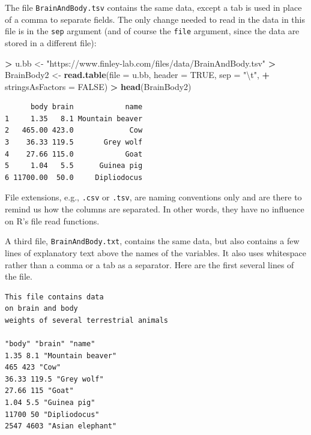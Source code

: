 \documentclass[
]{krantz}
\makeatletter
\newenvironment{Shaded}{\begin{snugshade}}{\end{snugshade}}
\newcommand{\CharTok}[1]{\textcolor[rgb]{0.5,0.5,0.5}{#1}}
\newcommand{\DataTypeTok}[1]{\textcolor[rgb]{0.27,0.27,0.27}{#1}}
\newcommand{\KeywordTok}[1]{\textcolor[rgb]{0.27,0.27,0.27}{\textbf{#1}}}
\newcommand{\NormalTok}[1]{#1}
\newcommand{\OperatorTok}[1]{\textcolor[rgb]{0.43,0.43,0.43}{\textbf{#1}}}
\newcommand{\OtherTok}[1]{\textcolor[rgb]{0.37,0.37,0.37}{#1}}
\newcommand{\StringTok}[1]{\textcolor[rgb]{0.5,0.5,0.5}{#1}}
\newenvironment{kframe}{%
\medskip{}
\setlength{\fboxsep}{.8em}
 \def\at@end@of@kframe{}%
 \ifinner\ifhmode%
  \def\at@end@of@kframe{\end{minipage}}%
  \begin{minipage}{\columnwidth}%
 \fi\fi%
 \def\FrameCommand##1{\hskip\@totalleftmargin \hskip-\fboxsep
 \colorbox{shadecolor}{##1}\hskip-\fboxsep
     \hskip-\linewidth \hskip-\@totalleftmargin \hskip\columnwidth}%
 \MakeFramed {\advance\hsize-\width
   \@totalleftmargin\z@ \linewidth\hsize
   \@setminipage}}%
 {\par\unskip\endMakeFramed%
 \at@end@of@kframe}
\renewenvironment{Shaded}{\begin{kframe}}{\end{kframe}}
\makeatother
\begin{document}
The file \texttt{BrainAndBody.tsv} contains the same data, except a tab is used in place of a comma to separate fields. The only change needed to read in the data in this file is in the \texttt{sep} argument (and of course the \texttt{file} argument, since the data are stored in a different file):

\begin{Shaded}
\begin{Highlighting}[]
\OperatorTok{\textgreater{}}\StringTok{ }\NormalTok{u.bb \textless{}{-}}\StringTok{ "https://www.finley{-}lab.com/files/data/BrainAndBody.tsv"}
\OperatorTok{\textgreater{}}\StringTok{ }\NormalTok{BrainBody2 \textless{}{-}}\StringTok{ }\KeywordTok{read.table}\NormalTok{(}\DataTypeTok{file =}\NormalTok{ u.bb, }\DataTypeTok{header =} \OtherTok{TRUE}\NormalTok{, }\DataTypeTok{sep =} \StringTok{"}\CharTok{\textbackslash{}t}\StringTok{"}\NormalTok{, }
\OperatorTok{+}\StringTok{                          }\DataTypeTok{stringsAsFactors =} \OtherTok{FALSE}\NormalTok{)}
\OperatorTok{\textgreater{}}\StringTok{ }\KeywordTok{head}\NormalTok{(BrainBody2)}
\end{Highlighting}
\end{Shaded}

\begin{verbatim}
      body brain            name
1     1.35   8.1 Mountain beaver
2   465.00 423.0             Cow
3    36.33 119.5       Grey wolf
4    27.66 115.0            Goat
5     1.04   5.5      Guinea pig
6 11700.00  50.0     Dipliodocus
\end{verbatim}

File extensions, e.g., \texttt{.csv} or \texttt{.tsv}, are naming conventions only and are there to remind us how the columns are separated. In other words, they have no influence on R's file read functions.

A third file, \texttt{BrainAndBody.txt}, contains the same data, but also contains a few lines of explanatory text above the names of the variables. It also uses whitespace rather than a comma or a tab as a separator. Here are the first several lines of the file.

\begin{verbatim}
This file contains data
on brain and body
weights of several terrestrial animals

"body" "brain" "name"
1.35 8.1 "Mountain beaver"
465 423 "Cow"
36.33 119.5 "Grey wolf"
27.66 115 "Goat"
1.04 5.5 "Guinea pig"
11700 50 "Dipliodocus"
2547 4603 "Asian elephant"
\end{verbatim}
\end{document}

